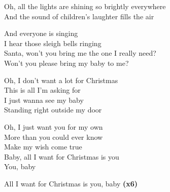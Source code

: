 Oh, all the lights are shining so brightly everywhere\\
And the sound of children's laughter fills the air

And everyone is singing\\
I hear those sleigh bells ringing\\
Santa, won't you bring me the one I really need?\\
Won't you please bring my baby to me?

Oh, I don't want a lot for Christmas\\
This is all I'm asking for\\
I just wanna see my baby\\
Standing right outside my door

Oh, I just want you for my own\\
More than you could ever know\\
Make my wish come true\\
Baby, all I want for Christmas is you\\
You, baby

All I want for Christmas is you, baby \textbf{(x6)}